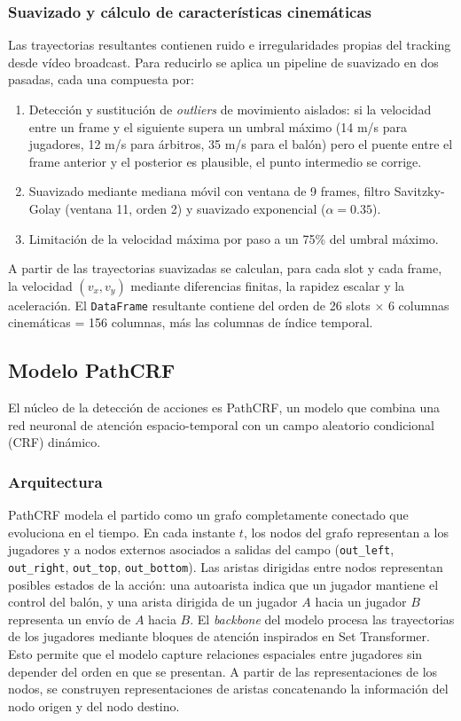 \subsubsection{Suavizado y cálculo de características cinemáticas}
Las trayectorias resultantes contienen ruido e irregularidades propias del tracking desde vídeo broadcast. Para reducirlo se aplica un pipeline de suavizado en dos pasadas, cada una compuesta por:
\begin{enumerate}
    \item Detección y sustitución de \textit{outliers} de movimiento aislados: si la velocidad entre un frame y el siguiente supera un umbral máximo (14 m/s para jugadores, 12 m/s para árbitros, 35 m/s para el balón) pero el puente entre el frame anterior y el posterior es plausible, el punto intermedio se corrige.
    \item Suavizado mediante mediana móvil con ventana de 9 frames, filtro Savitzky-Golay (ventana 11, orden 2) y suavizado exponencial ($\alpha = 0.35$).
    \item Limitación de la velocidad máxima por paso a un 75\% del umbral máximo.
\end{enumerate}
A partir de las trayectorias suavizadas se calculan, para cada slot y cada frame, la velocidad $(v_x, v_y)$ mediante diferencias finitas, la rapidez escalar y la aceleración. El \texttt{DataFrame} resultante contiene del orden de 26 slots $\times$ 6 columnas cinemáticas = 156 columnas, más las columnas de índice temporal.
\subsection{Modelo PathCRF}
El núcleo de la detección de acciones es PathCRF, un modelo que combina una red neuronal de atención espacio-temporal con un campo aleatorio condicional (CRF) dinámico.
\subsubsection{Arquitectura}
PathCRF modela el partido como un grafo completamente conectado que evoluciona en el tiempo. En cada instante $t$, los nodos del grafo representan a los jugadores y a nodos externos asociados a salidas del campo (\texttt{out\_left}, \texttt{out\_right}, \texttt{out\_top}, \texttt{out\_bottom}). Las aristas dirigidas entre nodos representan posibles estados de la acción: una autoarista indica que un jugador mantiene el control del balón, y una arista dirigida de un jugador $A$ hacia un jugador $B$ representa un envío de $A$ hacia $B$.
El \textit{backbone} del modelo procesa las trayectorias de los jugadores mediante bloques de atención inspirados en Set Transformer. Esto permite que el modelo capture relaciones espaciales entre jugadores sin depender del orden en que se presentan. A partir de las representaciones de los nodos, se construyen representaciones de aristas concatenando la información del nodo origen y del nodo destino.
